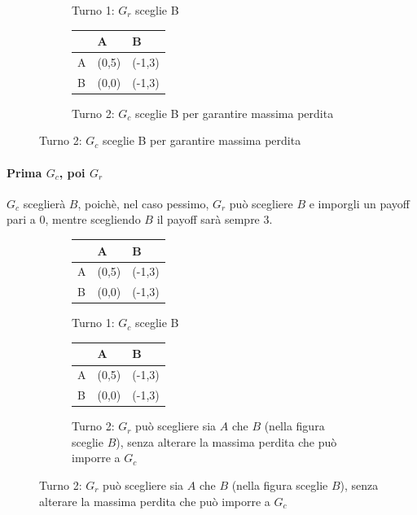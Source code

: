 \documentclass[\main/main.tex]{subfiles}
\begin{document}
\begin{figure}
\begin{subfigure}{0.24\textwidth}
\begin{tabular}{|L|L|L|}
        \hline
      \end{tabular}
    \caption{Turno 1: $G_r$ sceglie B}
  \end{subfigure}
  \begin{subfigure}{0.24\textwidth}
      \begin{tabular}{|L|L|L|}
        \hline
          & A                         & B                            \\
        \hline
        A & (0,5)                     &  (-1,3)    \\
        \hline
        B &  (0,0) &  (-1,3) \\
        \hline
      \end{tabular}
    \caption{Turno 2: $G_c$ sceglie B per garantire massima perdita}
  \end{subfigure}
\end{figure}


\paragraph*{Prima $G_c$, poi $G_r$}
$G_c$ sceglierà $B$, poichè, nel caso pessimo, $G_r$ può scegliere $B$ e imporgli un payoff pari a $0$, mentre scegliendo $B$ il payoff sarà sempre $3$.
\begin{figure}
  \begin{subfigure}{0.24\textwidth}
      \begin{tabular}{|L|L|L|}
        \hline
          & A     & B                         \\
        \hline
        A & (0,5) &  (-1,3) \\
        \hline
        B & (0,0) & (-1,3)  \\
        \hline
      \end{tabular}
    \caption{Turno 1: $G_c$ sceglie B}
  \end{subfigure}
  \begin{subfigure}{0.24\textwidth}
      \begin{tabular}{|L|L|L|}
        \hline
          & A                         & B                            \\
        \hline
        A & (0,5)                     &  (-1,3)    \\
        \hline
        B &  (0,0) &  (-1,3) \\
        \hline
      \end{tabular}
    \caption{Turno 2: $G_r$ può scegliere sia $A$ che $B$ (nella figura sceglie $B$), senza alterare la massima perdita che può imporre a $G_c$}
  \end{subfigure}
\end{figure}
\end{document}
